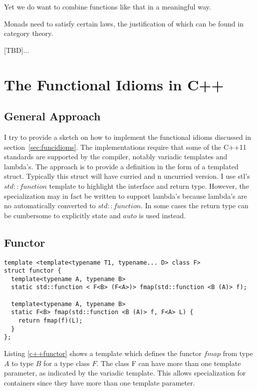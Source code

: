 \documentclass[12pt,fleqn]{article}
\begin{document}
Yet we do want  to combine functions like that in a meaningful way. 

Monads need to satisfy certain laws, the justification of which can be found in category theory.

[TBD]...


%
%
\section{The Functional Idioms in C++}
%
%
%

\subsection{General Approach}

I try to provide a sketch on how to implement the functional idioms discussed in section~\ref{sec:funcidioms}.
The implementations require that some of the C++11 standards are supported by the compiler, notably variadic templates and lambda's.
The approach is to provide a definition in the form of a templated struct. 
Typically this struct will have curried and n uncurried version.
I use stl's $std::function$ template to highlight the interface and return type. 
However, the specialization may in fact be written to support lambda's because lambda's are no automatically converted to
$std::function$. 
In some cases the return type can be cumbersome to explicitly state and $auto$ is used instead.


\subsection{Functor}
%
\begin{minipage}{\linewidth}
\begin{lstlisting}[caption=functor in C++, label=c++functor]
template <template<typename T1, typename... D> class F>
struct functor {
  template<typename A, typename B>
  static std::function < F<B> (F<A>)> fmap(std::function <B (A)> f);

  template<typename A, typename B>
  static F<B> fmap(std::function <B (A)> f, F<A> L) {
    return fmap(f)(L);
  }
};
\end{lstlisting}
\end{minipage}
%
%
%
Listing \ref{c++functor} shows a template which defines the functor $fmap$ from type $A$ to type $B$ for a type class $F$. 
The class F can have more than one template parameter, as indicated by the variadic template.
This allows specialization for containers since they have more than one template parameter.
\end{document}
